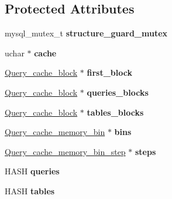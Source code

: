 \subsection*{Protected Attributes}
\begin{DoxyCompactItemize}
\item 
\mbox{\label{classQuery__cache_a7e619e7685b1b742dcb298c2c2ebb38e}} 
mysql\+\_\+mutex\+\_\+t {\bfseries structure\+\_\+guard\+\_\+mutex}
\item 
\mbox{\label{classQuery__cache_a798a6d1b5cc33e3906e9e741bbbcc65d}} 
uchar $\ast$ {\bfseries cache}
\item 
\mbox{\label{classQuery__cache_a6cbcf06463cbfa7fffe4bd8a8e102613}} 
\mbox{\hyperlink{structQuery__cache__block}{Query\+\_\+cache\+\_\+block}} $\ast$ {\bfseries first\+\_\+block}
\item 
\mbox{\label{classQuery__cache_afdb637aeb5aa0cb325ee0d53cf88e53e}} 
\mbox{\hyperlink{structQuery__cache__block}{Query\+\_\+cache\+\_\+block}} $\ast$ {\bfseries queries\+\_\+blocks}
\item 
\mbox{\label{classQuery__cache_a802584de7e5075a6c523f39337cc2c60}} 
\mbox{\hyperlink{structQuery__cache__block}{Query\+\_\+cache\+\_\+block}} $\ast$ {\bfseries tables\+\_\+blocks}
\item 
\mbox{\label{classQuery__cache_a0bccc405adce2c0ba1c58df293660e47}} 
\mbox{\hyperlink{structQuery__cache__memory__bin}{Query\+\_\+cache\+\_\+memory\+\_\+bin}} $\ast$ {\bfseries bins}
\item 
\mbox{\label{classQuery__cache_aa0552d5ee9c8bd343c668936138be2fc}} 
\mbox{\hyperlink{structQuery__cache__memory__bin__step}{Query\+\_\+cache\+\_\+memory\+\_\+bin\+\_\+step}} $\ast$ {\bfseries steps}
\item 
\mbox{\label{classQuery__cache_a833bf3256cd9b54e19182a3335c4496f}} 
H\+A\+SH {\bfseries queries}
\item 
\mbox{\label{classQuery__cache_a0fe58cf2840d4938b758816a32cbe0e7}} 
H\+A\+SH {\bfseries tables}

\end{DoxyCompactItemize}

